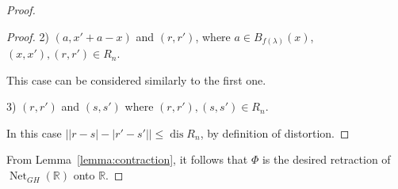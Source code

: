 \documentclass[10pt,a4paper]{amsart}
\newcommand{\R}{\mathbb{R}}
\newcommand{\dis}{\operatorname{dis}}
\newcommand{\nets}{\operatorname{Net}}
\begin{document}
\begin{proof}
\begin{proof}
2) $(a, x' + a-x)$ and $(r, r')$, where $a\in B_{f(\lambda)}(x)$, $(x, x'), (r, r')\in R_n$.

This case can be considered similarly to the first one.

3) $(r, r')$ and $(s, s')$ where $(r, r'), (s, s')\in R_n$. 

In this case $\big||r-s|-|r'-s'|\bigr|\le \dis R_n$, by definition of distortion.
\end{proof}


From Lemma~\ref{lemma:contraction}, it follows that $\Phi$ is the desired retraction of $\nets_{GH}(\R)$ onto $\R$.
\end{proof}
\end{document}
